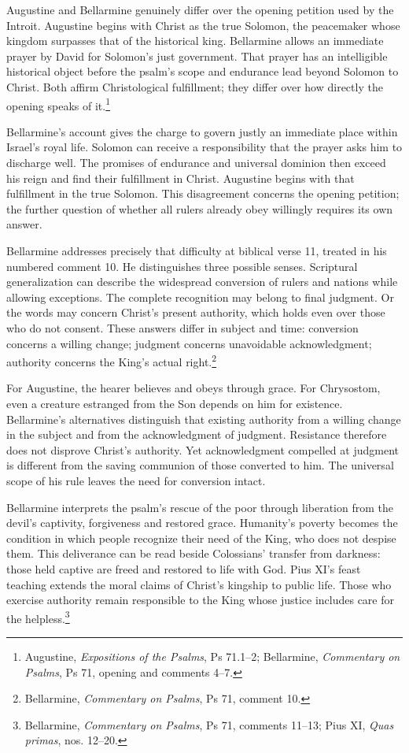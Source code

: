 Augustine and Bellarmine genuinely differ over the opening petition used by the Introit. Augustine begins with Christ as the true Solomon, the peacemaker whose kingdom surpasses that of the historical king. Bellarmine allows an immediate prayer by David for Solomon's just government. That prayer has an intelligible historical object before the psalm's scope and endurance lead beyond Solomon to Christ. Both affirm Christological fulfillment; they differ over how directly the opening speaks of it.\footnote{Augustine, \emph{Expositions of the Psalms}, Ps 71.1--2; Bellarmine, \emph{Commentary on Psalms}, Ps 71, opening and comments 4--7.}

Bellarmine's account gives the charge to govern justly an immediate place within Israel's royal life. Solomon can receive a responsibility that the prayer asks him to discharge well. The promises of endurance and universal dominion then exceed his reign and find their fulfillment in Christ. Augustine begins with that fulfillment in the true Solomon. This disagreement concerns the opening petition; the further question of whether all rulers already obey willingly requires its own answer.

Bellarmine addresses precisely that difficulty at biblical verse 11, treated in his numbered comment 10. He distinguishes three possible senses. Scriptural generalization can describe the widespread conversion of rulers and nations while allowing exceptions. The complete recognition may belong to final judgment. Or the words may concern Christ's present authority, which holds even over those who do not consent. These answers differ in subject and time: conversion concerns a willing change; judgment concerns unavoidable acknowledgment; authority concerns the King's actual right.\footnote{Bellarmine, \emph{Commentary on Psalms}, Ps 71, comment 10.}

For Augustine, the hearer believes and obeys through grace. For Chrysostom, even a creature estranged from the Son depends on him for existence. Bellarmine's alternatives distinguish that existing authority from a willing change in the subject and from the acknowledgment of judgment. Resistance therefore does not disprove Christ's authority. Yet acknowledgment compelled at judgment is different from the saving communion of those converted to him. The universal scope of his rule leaves the need for conversion intact.

Bellarmine interprets the psalm's rescue of the poor through liberation from the devil's captivity, forgiveness and restored grace. Humanity's poverty becomes the condition in which people recognize their need of the King, who does not despise them. This deliverance can be read beside Colossians' transfer from darkness: those held captive are freed and restored to life with God. Pius XI's feast teaching extends the moral claims of Christ's kingship to public life. Those who exercise authority remain responsible to the King whose justice includes care for the helpless.\footnote{Bellarmine, \emph{Commentary on Psalms}, Ps 71, comments 11--13; Pius XI, \emph{Quas primas}, nos. 12--20.}

